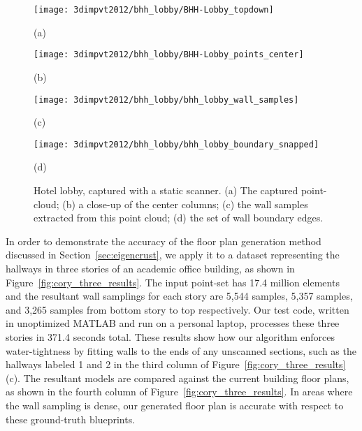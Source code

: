 \documentclass[12pt,onecolumn,oneside]{book}
\begin{document}
\begin{figure}[t]

\centering
\begin{minipage}[b]{0.40\linewidth}
  \centering
  \centerline{\texttt{[image: 3dimpvt2012/bhh\_lobby/BHH-Lobby\_topdown]}}
  \centerline{(a)}
\end{minipage}
\begin{minipage}[b]{0.40\linewidth}
  \centering
  \centerline{\texttt{[image: 3dimpvt2012/bhh\_lobby/BHH-Lobby\_points\_center]}}
  \centerline{(b)}
\end{minipage}

\begin{minipage}[b]{0.35\linewidth}
  \centering
  \centerline{\texttt{[image: 3dimpvt2012/bhh\_lobby/bhh\_lobby\_wall\_samples]}}
  \centerline{(c)}
\end{minipage}
\begin{minipage}[b]{0.35\linewidth}
  \centering
  \centerline{\texttt{[image: 3dimpvt2012/bhh\_lobby/bhh\_lobby\_boundary\_snapped]}}
  \centerline{(d)}
\end{minipage}

\caption[Hotel lobby, captured with a static scanner.]{Hotel lobby, captured with a static scanner. (a) The captured point-cloud; (b) a close-up of the center columns; (c) the wall samples extracted from this point cloud; (d) the set of wall boundary edges.}
\label{fig:bhh_lobby_results}

\end{figure}

In order to demonstrate the accuracy of the floor plan generation method discussed in Section~\ref{sec:eigencrust}, we apply it to a dataset representing the hallways in three stories of an academic office building, as shown in Figure~\ref{fig:cory_three_results}.  The input point-set has 17.4 million elements and the resultant wall samplings for each story are 5,544 samples, 5,357 samples, and 3,265 samples from bottom story to top respectively.  Our test code, written in unoptimized MATLAB and run on a personal laptop, processes these three stories in 371.4 seconds total.  These results show how our algorithm enforces water-tightness by fitting walls to the ends of any unscanned sections, such as the hallways labeled 1 and 2 in the third column of Figure~\ref{fig:cory_three_results}(c).  The resultant models are compared against the current building floor plans, as shown in the fourth column of Figure~\ref{fig:cory_three_results}.  In areas where the wall sampling is dense, our generated floor plan is accurate with respect to these ground-truth blueprints.
\end{document}
